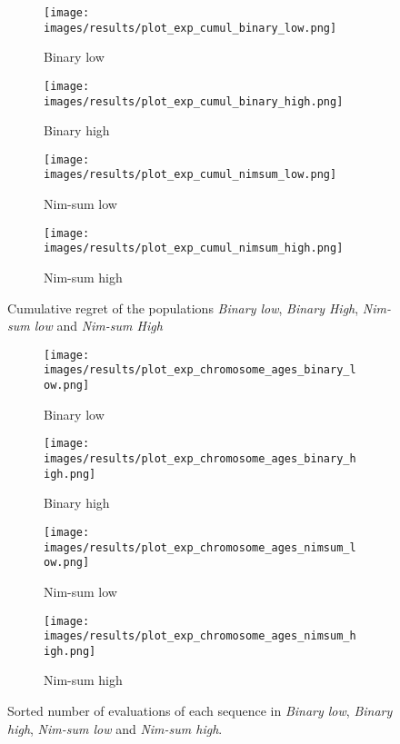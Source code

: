 \begin{figure}[ht]
	\begin{subfigure}{0.49\linewidth}
	\centering
	\texttt{[image: images/results/plot\_exp\_cumul\_binary\_low.png]}
	\caption{Binary low}
	\label{fig:exp_cumul_binary_low}
	\end{subfigure}
	\hfill
	\begin{subfigure}{0.49\linewidth}
	\centering
	\texttt{[image: images/results/plot\_exp\_cumul\_binary\_high.png]}
	\caption{Binary high}
	\label{fig:exp_cumul_binary_high}
	\end{subfigure}
	\begin{subfigure}{0.49\linewidth}
	\centering
	\texttt{[image: images/results/plot\_exp\_cumul\_nimsum\_low.png]}
	\caption{Nim-sum low}
	\label{fig:exp_cumul_nimsum_low}
	\end{subfigure}
	\hfill
	\begin{subfigure}{0.49\linewidth}
	\centering
	\texttt{[image: images/results/plot\_exp\_cumul\_nimsum\_high.png]}
	\caption{Nim-sum high}
	\label{fig:exp_cumul_nimsum_high}
	\end{subfigure}
	\caption[Cumulative regret in Binary and Nim-sum]{Cumulative regret of the populations \emph{Binary low},
	\emph{Binary High}, \emph{Nim-sum low} and \emph{Nim-sum High}}
	\label{fig:exp_cumul2}
\end{figure}

\begin{figure}[ht]
	\begin{subfigure}{0.49\linewidth}
	\centering
	\texttt{[image: images/results/plot\_exp\_chromosome\_ages\_binary\_low.png]}
	\caption{Binary low}
	\label{fig:exp_age_binary_low}
	\end{subfigure}
	\hfill
	\begin{subfigure}{0.49\linewidth}
	\centering
	\texttt{[image: images/results/plot\_exp\_chromosome\_ages\_binary\_high.png]}
	\caption{Binary high}
	\label{fig:exp_age_binary_high}
	\end{subfigure}
	\begin{subfigure}{0.49\linewidth}
	\centering
	\texttt{[image: images/results/plot\_exp\_chromosome\_ages\_nimsum\_low.png]}
	\caption{Nim-sum low}
	\label{fig:exp_age_nimsum_low}
	\end{subfigure}
	\hfill
	\begin{subfigure}{0.49\linewidth}
	\centering
	\texttt{[image: images/results/plot\_exp\_chromosome\_ages\_nimsum\_high.png]}
	\caption{Nim-sum high}
	\label{fig:exp_age_nimsum_high}
	\end{subfigure}
	\caption[Sorted number of evaluations in Binary and Nim-sum]{Sorted number of evaluations of each sequence in \emph{Binary
	low}, \emph{Binary high}, \emph{Nim-sum low} and \emph{Nim-sum high}.}
	\label{fig:exp_ages2}
\end{figure}

